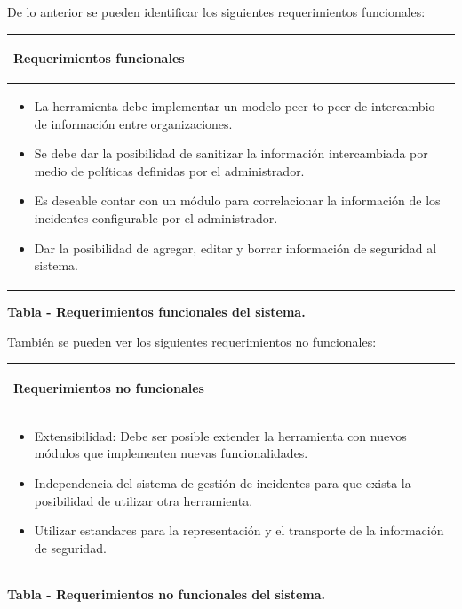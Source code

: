 \bigskip
\newpage
	De lo anterior se pueden identificar los siguientes requerimientos funcionales:
\begin{flushleft}
	\tablefirsthead{}
	\tablehead{}
	\tabletail{}
	\tablelasttail{}
	\begin{supertabular}{|m{5.83516in}|}
		\hline
		\begin{center}{\bfseries Requerimientos funcionales}
		\end{center}
		\\\hline
		\begin{itemize}
			\item {La herramienta debe implementar un modelo peer-to-peer de intercambio de
				información entre organizaciones.}
			\item {Se debe dar la posibilidad de sanitizar la información intercambiada por medio
				de políticas definidas por el administrador.}
			\item {Es deseable contar con un módulo para correlacionar la información de los
				incidentes configurable por el administrador.}
			\item {Dar la posibilidad de agregar, editar y borrar información de seguridad al sistema.}
		\end{itemize}
		\\\hline
	\end{supertabular}
\end{flushleft}
{\centering{}\bfseries
	\foreignlanguage{spanish}{Tabla }\foreignlanguage{spanish}{ - Requerimientos funcionales
		del sistema.}
	\par}
\newpage

	También se pueden ver los siguientes requerimientos no funcionales:

\begin{flushleft}
	\tablefirsthead{}
	\tablehead{}
	\tabletail{}
	\tablelasttail{}
	\begin{supertabular}{|m{5.83516in}|}
		\hline
		\begin{center}{\bfseries Requerimientos no funcionales}
		\end{center}
		\\\hline
		\begin{itemize}
			\item {Extensibilidad: Debe ser posible extender la herramienta con nuevos módulos que
				implementen nuevas funcionalidades.}
			\item {Independencia del sistema de gestión de incidentes para que exista la posibilidad de
				utilizar otra herramienta.}
			\item {Utilizar estandares para la representación y el transporte de la información de seguridad.}
		\end{itemize}\\
		 \hline
	\end{supertabular}
\end{flushleft}
{\centering{}\bfseries
	\foreignlanguage{spanish}{Tabla }\foreignlanguage{spanish}{ - Requerimientos no
		funcionales del sistema.}
	\par}
\bigskip

